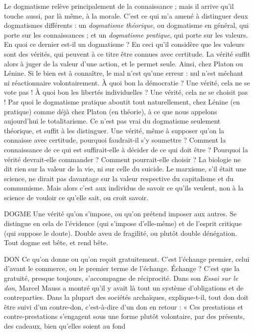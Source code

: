 Le dogmatisme relève principalement de la connaissance ; mais il arrive
qu'il touche aussi, par là même, à la morale. C’est ce qui m’a amené à distinguer
deux dogmatismes différents : un {\it dogmatisme théorique}, ou dogmatisme
en général, qui porte sur les connaissances ; et un {\it dogmatisme pratique}, qui
porte sur les valeurs. En quoi ce dernier est-il un dogmatisme ? En ceci qu’il
considère que les valeurs sont des vérités, qui peuvent à ce titre être connues
avec certitude. La vérité suffit alors à juger de la valeur d’une action, et le
permet seule. Ainsi, chez Platon ou Lénine. Si le bien est à connaître, le mal
n’est qu’une erreur : nul n’est méchant ni réactionnaire volontairement. À quoi
bon la démocratie ? Une vérité, cela ne se vote pas ! À quoi bon les libertés
individuelles ? Une vérité, cela ne se choisit pas ! Par quoi le dogmatisme pratique
aboutit tout naturellement, chez Lénine (en pratique) comme déjà chez
Platon (en théorie), à ce que nous appelons aujourd’hui le totalitarisme. Ce
n'est pas vrai du dogmatisme seulement théorique, et suffit à les distinguer.
Une vérité, même à supposer qu’on la connaisse avec certitude, pourquoi faudrait-il
s’y soumettre ? Comment la connaissance de ce qui est suffirait-elle à
décider de ce qui doit être ? Pourquoi la vérité devrait-elle commander ? Comment
pourrait-elle choisir ? La biologie ne dit rien sur la valeur de la vie, ni sur
celle du suicide. Le marxisme, s’il était une science, ne dirait pas davantage sur
la valeur respective du capitalisme et du communisme. Mais alors c’est aux
individus de savoir ce qu’ils veulent, non à la science de vouloir ce qu’elle sait,
ou croit savoir.

DOGME Une vérité qu’on s’impose, ou qu’on prétend imposer aux autres.
Se distingue en cela de l’évidence (qui s'impose d’elle-même) et de
l'esprit critique (qui suppose le doute). Double aveu de fragilité, ou plutôt
double dénégation. Tout dogme est bête, et rend bête.

DON Ce qu’on donne ou qu’on reçoit gratuitement. C’est l’échange premier,
celui d’avant le commerce, ou le premier terme de l'échange.
Échange ? C’est que la gratuité, presque toujours, s'accompagne de réciprocité.
Dans son {\it Essai sur le don}, Marcel Mauss a montré qu’il y avait là tout un système
d’obligations et de contreparties. Dans la plupart des sociétés archaïques,
explique-t-il, tout don doit être suivi d’un contre-don, c’est-à-dire d’un don en
retour : « Ces prestations et contre-prestations s’engagent sous une forme
plutôt volontaire, par des présents, des cadeaux, bien qu’elles soient au fond

